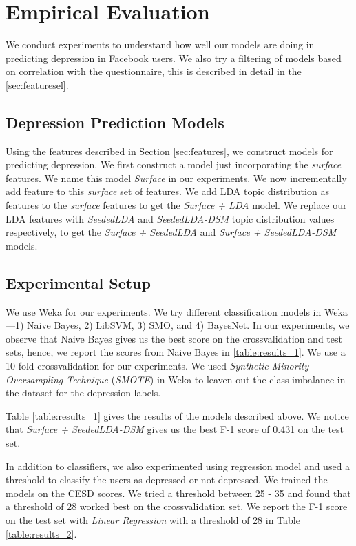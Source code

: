 
\section{Empirical Evaluation}
\label{sec:experiments}

We conduct experiments to understand how well our models are doing in predicting depression in Facebook users. We also try a filtering of models based on correlation with the questionnaire, this is described in detail in the \ref{sec:featuresel}.
\subsection{Depression Prediction Models}

Using the features described in Section \ref{sec:features}, we construct models for predicting depression. We first construct a model just incorporating the \textit{surface} features. We name this model \textit{Surface} in our experiments. We now incrementally add feature to this \textit{surface} set of features. We add LDA topic distribution as features to the \textit{surface} features to get the \textit{Surface + LDA} model. We replace our LDA features with \textit{SeededLDA} and \textit{SeededLDA-{DSM}} topic distribution values respectively, to get the \textit{Surface + SeededLDA} and \textit{Surface + SeededLDA-DSM} models. 

\subsection{Experimental Setup}

We use Weka \cite{weka} for our experiments. We try different classification models in Weka---1) Naive Bayes, 2) LibSVM, 3) SMO, and 4) BayesNet. In our experiments, we observe that Naive Bayes gives us the best score on the crossvalidation and test sets, hence, we report the scores from Naive Bayes in \ref{table:results_1}. We use a 10-fold crossvalidation for our experiments. We used \textit{Synthetic Minority Oversampling Technique} (\textit{SMOTE}) in Weka to leaven out the class imbalance in the dataset for the depression labels.

Table \ref{table:results_1} gives the results of the models described above. We notice that  \textit{Surface + SeededLDA-DSM} gives us the best F-1 score of 0.431 on the test set.

In addition to classifiers, we also experimented using regression model and used a threshold to classify the users as depressed or not depressed. We trained the models on the CESD scores. We tried a threshold between 25 - 35 and found that a threshold of 28 worked best on the crossvalidation set. We report the F-1 score on the test set with \textit{Linear Regression} with a threshold of 28 in Table \ref{table:results_2}. 


